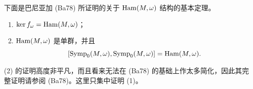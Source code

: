 下面是巴尼亚加 (Ba78) 所证明的关于 $\operatorname{Ham}(M,\omega)$ 结构的基本定理。

\begin{theorem}[巴尼亚加]
\label{thm:banyaga-structure-ham}
\begin{enumerate}[label=(\arabic*)]
  \item $\ker f_\omega=\operatorname{Ham}(M,\omega)$；
  \item $\operatorname{Ham}(M,\omega)$ 是单群，并且
  \[
    [\operatorname{Symp}_0(M,\omega),\operatorname{Symp}_0(M,\omega)]=\operatorname{Ham}(M,\omega).
  \]
\end{enumerate}
\end{theorem}

(2) 的证明高度非平凡，而且看来无法在 (Ba78) 的基础上作太多简化，因此其完整证明请参阅 (Ba78)。这里只集中证明 (1)。

